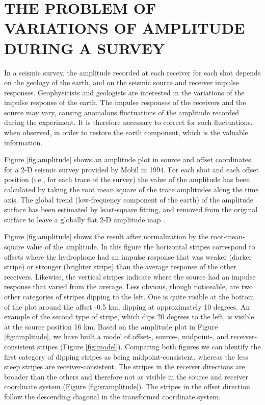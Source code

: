 
\section{THE PROBLEM OF VARIATIONS OF AMPLITUDE DURING A SURVEY}
\par
In a seismic survey, the amplitude recorded at each receiver for each shot
depends on the geology of the earth, and on the seismic source and receiver
impulse responses. Geophysicists and geologists are interested in the 
variations of the impulse response of the earth. The impulse responses
of the receivers and the source may vary, causing anomalous fluctuations
of the amplitude recorded during the experiment. It is therefore necessary 
to correct for such fluctuations, when observed, in order to restore the 
earth component, which is the valuable information.

\par
Figure \ref{fig:amplitude} shows an amplitude plot in source and offset
coordinates for a 2-D seismic survey provided by Mobil in 1994. For each 
shot and each offset position (i.e., for each trace of the survey)
the value of the amplitude has been calculated by taking the root mean
square of the trace amplitudes along the time axis. The global trend 
(low-frequency component of the earth) of the amplitude surface has been 
estimated by least-square fitting, and removed from the original surface
to leave a globally flat 2-D amplitude map \cite[]{Berlioux.sep.80.349}.


\par
Figure \ref{fig:amplitude} shows the result after normalization by the 
root-mean-square value of the amplitude. In this figure the horizontal
stripes correspond to offsets where the hydrophone had an impulse response
that was weaker (darker stripe) or stronger (brighter stripe) than the
average response of the other receivers. Likewise, the vertical
stripes indicate where the source had an impulse response that varied from 
the average. Less obvious, though noticeable, are two other categories of 
stripes dipping to the left. One is quite visible at the bottom of 
the plot around the offset -0.5 km, dipping at approximately 10 degrees. 
An example of the second type of stripe, which dips 20 degrees to the left, 
is visible at the source position 16 km. Based on the amplitude plot in 
Figure \ref{fig:amplitude}, we have built a model of offset-, source-, midpoint-, 
and receiver-consistent stripes (Figure \ref{fig:model}). Comparing both figures 
we can identify the first category of dipping stripes as being 
midpoint-consistent, whereas the less steep stripes are receiver-consistent. 
The stripes in the receiver directions are broader than the others and 
therefore not as visible in the source and receiver coordinate system (Figure 
\ref{fig:sramplitude}). The stripes in the offset direction follow the descending 
diagonal in the transformed coordinate system.

